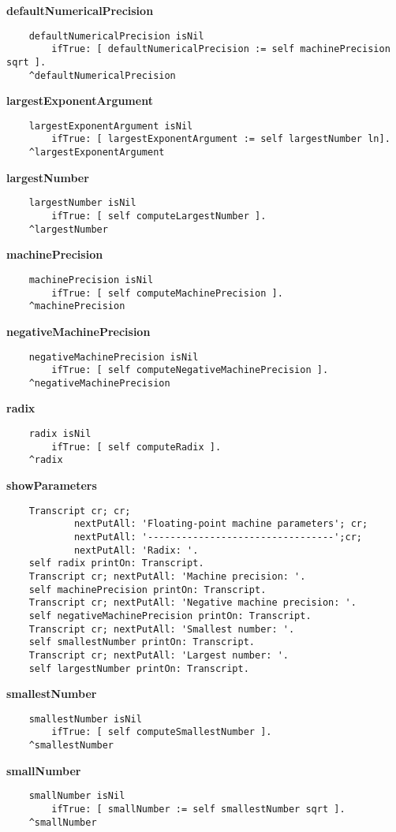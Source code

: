 {\bf defaultNumericalPrecision}
\begin{verbatim}
    defaultNumericalPrecision isNil
        ifTrue: [ defaultNumericalPrecision := self machinePrecision sqrt ].
    ^defaultNumericalPrecision
\end{verbatim}
{\bf largestExponentArgument}
\begin{verbatim}
    largestExponentArgument isNil
        ifTrue: [ largestExponentArgument := self largestNumber ln].
    ^largestExponentArgument
\end{verbatim}
{\bf largestNumber}
\begin{verbatim}
    largestNumber isNil
        ifTrue: [ self computeLargestNumber ].
    ^largestNumber
\end{verbatim}
{\bf machinePrecision}
\begin{verbatim}
    machinePrecision isNil
        ifTrue: [ self computeMachinePrecision ].
    ^machinePrecision
\end{verbatim}
{\bf negativeMachinePrecision}
\begin{verbatim}
    negativeMachinePrecision isNil
        ifTrue: [ self computeNegativeMachinePrecision ].
    ^negativeMachinePrecision
\end{verbatim}
{\bf radix}
\begin{verbatim}
    radix isNil
        ifTrue: [ self computeRadix ].
    ^radix
\end{verbatim}
{\bf showParameters}
\begin{verbatim}
    Transcript cr; cr;
            nextPutAll: 'Floating-point machine parameters'; cr;
            nextPutAll: '---------------------------------';cr;
            nextPutAll: 'Radix: '.
    self radix printOn: Transcript.
    Transcript cr; nextPutAll: 'Machine precision: '.
    self machinePrecision printOn: Transcript.
    Transcript cr; nextPutAll: 'Negative machine precision: '.
    self negativeMachinePrecision printOn: Transcript.
    Transcript cr; nextPutAll: 'Smallest number: '.
    self smallestNumber printOn: Transcript.
    Transcript cr; nextPutAll: 'Largest number: '.
    self largestNumber printOn: Transcript.         
\end{verbatim}
{\bf smallestNumber}
\begin{verbatim}
    smallestNumber isNil
        ifTrue: [ self computeSmallestNumber ].
    ^smallestNumber
\end{verbatim}
{\bf smallNumber}
\begin{verbatim}
    smallNumber isNil
        ifTrue: [ smallNumber := self smallestNumber sqrt ].
    ^smallNumber
\end{verbatim}

